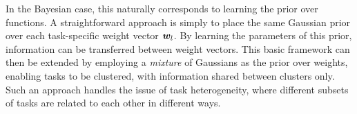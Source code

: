 In the Bayesian case, this naturally corresponds to learning the prior over functions. A straightforward approach\cite{Allenby1999} is simply to place the same Gaussian prior over each task-specific weight vector $\bm w_l$. By learning the parameters of this prior, information can be transferred between weight vectors. This basic framework can then be extended by employing a \emph{mixture} of Gaussians as the prior over weights\cite{BakkerHeskes2003}, enabling tasks to be clustered, with information shared between clusters only. Such an approach handles the issue of task heterogeneity, where different subsets of tasks are related to each other in different ways.


%


